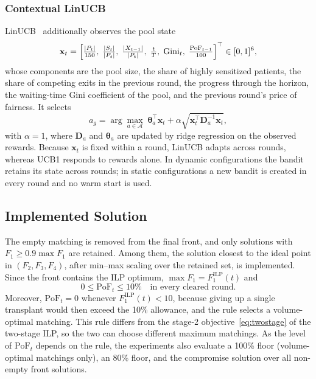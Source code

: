 \documentclass[journal]{IEEEtran}
\begin{document}
\subsubsection{Contextual LinUCB}
LinUCB~\cite{li2010contextual} additionally observes the pool state
\begin{equation}
  \mathbf{x}_t = \Bigl[\tfrac{|P_t|}{150},\;
  \tfrac{|S_t|}{|P_t|},\;
  \tfrac{|X_{t-1}|}{|P_t|},\;
  \tfrac{t}{T},\;
  \mathrm{Gini}_t,\;
  \tfrac{\mathrm{PoF}_{t-1}}{100}\Bigr]^{\top} \in [0,1]^6 ,
  \label{eq:context}
\end{equation}
whose components are the pool size, the share of highly sensitized
patients, the share of competing exits in the previous round, the
progress through the horizon, the waiting-time Gini coefficient of the
pool, and the previous round's price of fairness.
It selects
\begin{equation}
  a_g = \arg\max_{a \in \mathcal{A}} \;
        \boldsymbol{\theta}_a^{\top} \mathbf{x}_t
        + \alpha \sqrt{\mathbf{x}_t^{\top} \mathbf{D}_a^{-1} \mathbf{x}_t} ,
  \label{eq:linucb}
\end{equation}
with $\alpha = 1$, where $\mathbf{D}_a$ and $\boldsymbol{\theta}_a$ are
updated by ridge regression on the observed rewards.
Because $\mathbf{x}_t$ is fixed within a round, LinUCB adapts across
rounds, whereas UCB1 responds to rewards alone.
In dynamic configurations the bandit retains its state across rounds;
in static configurations a new bandit is created in every round and no
warm start is used.

\subsection{Implemented Solution}
\label{sec:method:select}

The empty matching is removed from the final front, and only solutions
with $F_1 \geq 0.9 \max F_1$ are retained.
Among them, the solution closest to the ideal point in
$(F_2, F_3, F_4)$, after min--max scaling over the retained set, is
implemented.
Since the front contains the ILP optimum, $\max F_1 = F_1^{\mathrm{ILP}}(t)$
and
\begin{equation}
  0 \leq \mathrm{PoF}_t \leq 10\% \quad \text{in every cleared round.}
  \label{eq:pofbound}
\end{equation}
Moreover, $\mathrm{PoF}_t = 0$ whenever $F_1^{\mathrm{ILP}}(t) < 10$,
because giving up a single transplant would then exceed the 10\%
allowance, and the rule selects a volume-optimal matching.
This rule differs from the stage-2 objective~\eqref{eq:twostage} of
the two-stage ILP, so the two can choose different maximum matchings.
As the level of $\mathrm{PoF}_t$ depends on the rule, the experiments
also evaluate a 100\% floor (volume-optimal matchings only), an 80\%
floor, and the compromise solution over all non-empty front solutions.
\end{document}
